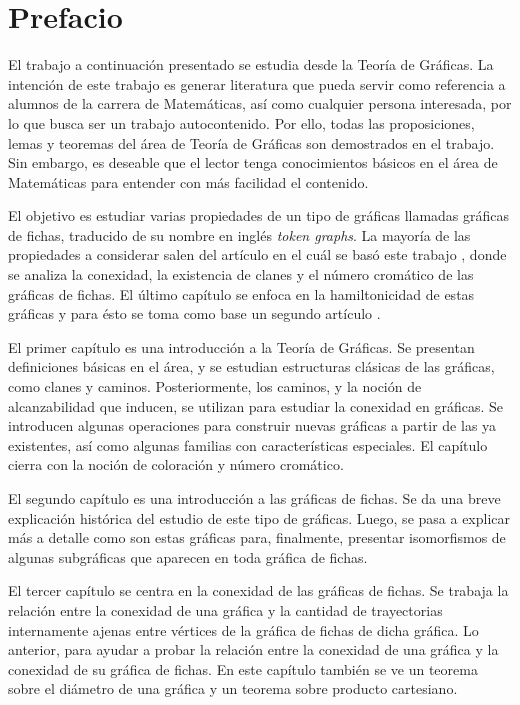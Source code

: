 \chapter{Prefacio}
\label{sec:prefacio}

El trabajo a continuaci\'on presentado se estudia desde la Teor\'ia de
Gr\'aficas. La intenci\'on de este trabajo es generar literatura que pueda
servir como referencia a alumnos de la carrera de Matem\'aticas, as\'i como
cualquier persona interesada, por lo que busca ser un trabajo autocontenido. Por
ello, todas las proposiciones, lemas y teoremas del \'area de Teor\'ia de
Gr\'aficas son demostrados en el trabajo. Sin embargo, es deseable que el lector
tenga conocimientos b\'asicos en el \'area de Matem\'aticas para entender con
m\'as facilidad el contenido. 

El objetivo es estudiar varias propiedades de un tipo de gr\'aficas llamadas
gr\'aficas de fichas, traducido de su nombre en ingl\'es \textit{token
graphs}. La mayor\'ia de las propiedades a considerar salen del art\'iculo en
el cu\'al se bas\'o este trabajo \cite{fabilaToken}, donde se analiza la
conexidad, la existencia de clanes y el n\'umero crom\'atico de las gr\'aficas
de fichas. El \'ultimo cap\'itulo se enfoca en la hamiltonicidad de estas
gr\'aficas y para \'esto se toma como base un segundo art\'iculo
\cite{adameHamilt}. 

El primer cap\'itulo es una introducci\'on a la Teor\'ia de Gr\'aficas.  Se
presentan definiciones b\'asicas en el \'area, y se estudian estructuras
cl\'asicas de las gr\'aficas, como clanes y caminos.   Posteriormente, los
caminos, y la noci\'on de alcanzabilidad que inducen, se utilizan para estudiar
la conexidad en gr\'aficas.   Se introducen algunas operaciones para construir
nuevas gr\'aficas a partir de las ya existentes, as\'i como algunas familias con
caracter\'isticas especiales.   El cap\'itulo cierra con la noci\'on de
coloraci\'on y n\'umero crom\'atico.

El segundo cap\'itulo es una introducci\'on a las gr\'aficas de fichas. Se da
una breve explicaci\'on hist\'orica del estudio de este tipo de gr\'aficas.
Luego, se pasa a explicar m\'as a detalle como son estas gr\'aficas para,
finalmente, presentar isomorfismos de algunas subgr\'aficas que aparecen en toda
gr\'afica de fichas.

El tercer cap\'itulo se centra en la conexidad de las gr\'aficas de fichas. Se
trabaja la relaci\'on entre la conexidad de una gr\'afica y la cantidad de
trayectorias internamente ajenas entre v\'ertices de la gr\'afica de fichas de
dicha gr\'afica. Lo anterior, para ayudar a probar la relaci\'on entre la
conexidad de una gr\'afica y la conexidad de su gr\'afica de fichas. En este
cap\'itulo tambi\'en se ve un teorema sobre el di\'ametro de una gr\'afica y un
teorema sobre producto cartesiano.


